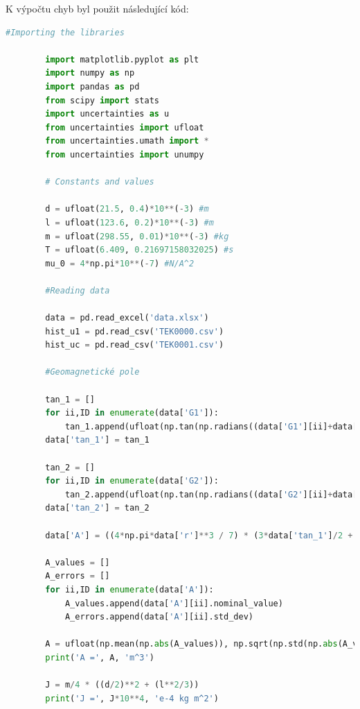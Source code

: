 \documentclass[a4paper,11pt]{article}
\begin{document}
\newpage
    \par K výpočtu chyb byl použit následující kód: 
    \begin{lstlisting}[language=Python, basicstyle=\tiny, breaklines=true, postbreak=\mbox{\textbackslashspace}]
        #Importing the libraries

        import matplotlib.pyplot as plt
        import numpy as np
        import pandas as pd
        from scipy import stats
        import uncertainties as u 
        from uncertainties import ufloat
        from uncertainties.umath import *
        from uncertainties import unumpy

        # Constants and values

        d = ufloat(21.5, 0.4)*10**(-3) #m
        l = ufloat(123.6, 0.2)*10**(-3) #m
        m = ufloat(298.55, 0.01)*10**(-3) #kg
        T = ufloat(6.409, 0.21697158032025) #s
        mu_0 = 4*np.pi*10**(-7) #N/A^2

        #Reading data

        data = pd.read_excel('data.xlsx')
        hist_u1 = pd.read_csv('TEK0000.csv')
        hist_uc = pd.read_csv('TEK0001.csv')

        #Geomagnetické pole

        tan_1 = []
        for ii,ID in enumerate(data['G1']):
            tan_1.append(ufloat(np.tan(np.radians((data['G1'][ii]+data['G1_rot'][ii])/2)), np.std(np.array([np.tan(np.radians(data['G1'][ii])),np.tan(np.radians(data['G1_rot'][ii]))]))))
        data['tan_1'] = tan_1
        
        tan_2 = []
        for ii,ID in enumerate(data['G2']):
            tan_2.append(ufloat(np.tan(np.radians((data['G2'][ii]+data['G2_rot'][ii])/2)), np.std(np.array([np.tan(np.radians(data['G2'][ii])),np.tan(np.radians(data['G2_rot'][ii]))]))))
        data['tan_2'] = tan_2
        
        data['A'] = ((4*np.pi*data['r']**3 / 7) * (3*data['tan_1']/2 + 4*data['tan_2'])) 
        
        A_values = []
        A_errors = []
        for ii,ID in enumerate(data['A']):
            A_values.append(data['A'][ii].nominal_value)
            A_errors.append(data['A'][ii].std_dev)
        
        A = ufloat(np.mean(np.abs(A_values)), np.sqrt(np.std(np.abs(A_values))**2 + np.mean(np.abs(A_errors))**2))
        print('A =', A, 'm^3')
        
        J = m/4 * ((d/2)**2 + (l**2/3))
        print('J =', J*10**4, 'e-4 kg m^2')
        

\end{lstlisting}
\end{document}
